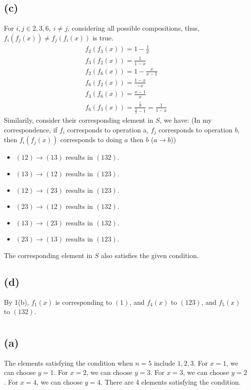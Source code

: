 \documentclass[12pt]{article}
\begin{document}
\subsection*{(c)}
For $i,j\in{2,3,6},\ i\ne j$, considering all possible compositions, thus, $f_i(f_j(x))\ne f_j(f_i(x))$ is true.
\begin{align*}
f_2(f_3(x))=1-\frac{1}{x} \\
f_3(f_2(x))=\frac{1}{1-x} \\
f_2(f_6(x))=1-\frac{x}{x-1} \\
f_6(f_2(x))=\frac{1-x}{-x} \\
f_3(f_6(x))=\frac{x-1}{x} \\
f_6(f_3(x))=\frac{\frac{1}{x}}{\frac{1}{x}-1}=\frac{1}{1-x}
\end{align*}
Similarily, consider their corresponding element in $S$, we have: (In my correspondence, if $f_i$ corresponds to operation a, $f_j$ corresponds to operation $b$, then $f_i(f_j(x))$ corresponds to doing $a$ then $b$ ($a\rightarrow b$))
\begin{itemize}
    \item $(12)\rightarrow(13)$ results in $(132)$.
    \item $(13)\rightarrow(12)$ results in $(123)$.
    \item $(12)\rightarrow(23)$ results in $(123)$.
    \item $(23)\rightarrow(12)$ results in $(132)$.
    \item $(13)\rightarrow(23)$ results in $(132)$.
    \item $(23)\rightarrow(13)$ results in $(123)$.
\end{itemize}
The corresponding element in $S$ also satisfies the given condition.
\subsection*{(d)}
By 1(b), $f_1(x)$ is corresponding to $(1)$, and $f_4(x)$ to $(123)$, and $f_5(x)$ to $(132)$.
\section{}
\subsection*{(a)}
The elements satisfying the condition when $n=5$ include $1,2,3$. For $x=1$, we can choose $y=1$. For $x=2$, we can choose $y=3$. For $x=3$, we can choose $y=2$. For $x=4$, we can choose $y=4$. There are 4 elements satisfying the condition.
\end{document}
